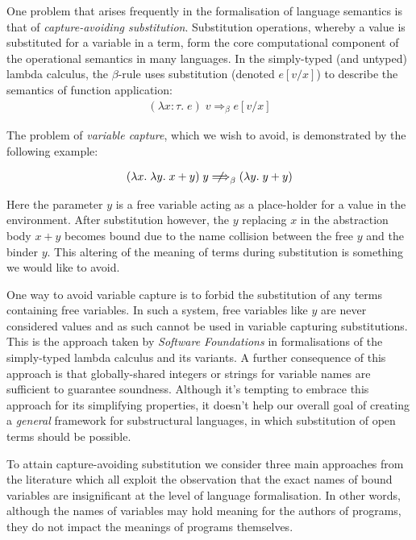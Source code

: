 \documentclass[]{unswthesis}
\let\i\textit
\begin{document}
One problem that arises frequently in the formalisation of language semantics is that of \i{capture-avoiding substitution}. Substitution operations, whereby a value is substituted for a variable in a term, form the core computational component of the operational semantics in many languages. In the simply-typed (and untyped) lambda calculus, the $\beta$-rule uses substitution (denoted $e[v/x]$) to describe the semantics of function application:
\begin{eqnarray*}
(\lambda x : \tau. \; e) \; v \Longrightarrow_\beta e[v/x]
\end{eqnarray*}

The problem of \i{variable capture}, which we wish to avoid, is demonstrated by the following example:

\begin{eqnarray*}
(\lambda x. \; \lambda y. \; x + y) \; y \; {\centernot\Longrightarrow}_\beta \; (\lambda y. \; y + y)
\end{eqnarray*}

Here the parameter $y$ is a free variable acting as a place-holder for a value in the environment. After substitution however, the $y$ replacing $x$ in the abstraction body $x + y$ becomes bound due to the name collision between the free $y$ and the binder $y$. This altering of the meaning of terms during substitution is something we would like to avoid.

One way to avoid variable capture is to forbid the substitution of any terms containing free variables. In such a system, free variables like $y$ are never considered values and as such cannot be used in variable capturing substitutions. This is the approach taken by \i{Software Foundations} \cite{pierce15} in formalisations of the simply-typed lambda calculus and its variants. A further consequence of this approach is that globally-shared integers or strings for variable names are sufficient to guarantee soundness. Although it's tempting to embrace this approach for its simplifying properties, it doesn't help our overall goal of creating a \i{general} framework for substructural languages, in which substitution of open terms should be possible.

To attain capture-avoiding substitution we consider three main approaches from the literature which all exploit the observation that the exact names of bound variables are insignificant at the level of language formalisation. In other words, although the names of variables may hold meaning for the authors of programs, they do not impact the meanings of programs themselves.
\end{document}
